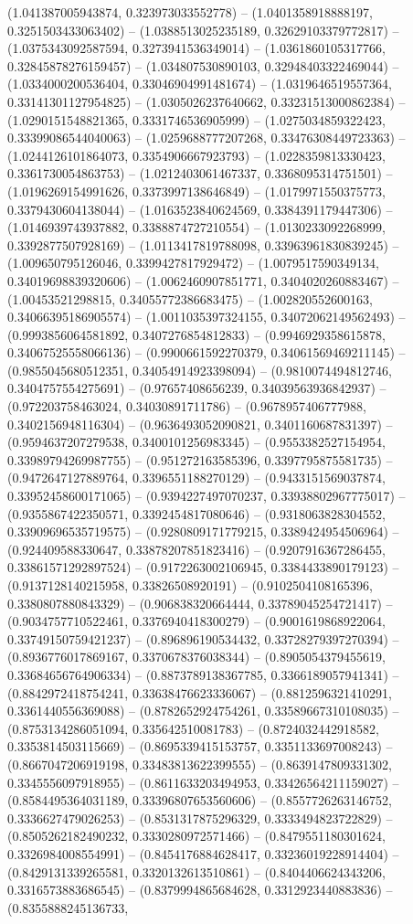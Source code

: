 (1.041387005943874, 0.323973033552778) -- (1.0401358918888197, 0.3251503433063402) -- (1.0388513025235189, 0.32629103379772817) -- (1.0375343092587594, 0.3273941536349014) -- (1.0361860105317766, 0.32845878276159457) -- (1.034807530890103, 0.32948403322469044) -- (1.0334000200536404, 0.33046904991481674) -- (1.0319646519557364, 0.33141301127954825) -- (1.0305026237640662, 0.33231513000862384) -- (1.0290151548821365, 0.3331746536905999) -- (1.0275034859322423, 0.33399086544040063) -- (1.0259688777207268, 0.33476308449723363) -- (1.0244126101864073, 0.3354906667923793) -- (1.0228359813330423, 0.3361730054863753) -- (1.0212403061467337, 0.3368095314751501) -- (1.0196269154991626, 0.3373997138646849) -- (1.0179971550375773, 0.3379430604138044) -- (1.0163523840624569, 0.3384391179447306) -- (1.0146939743937882, 0.3388874727210554) -- (1.0130233092268999, 0.3392877507928169) -- (1.0113417819788098, 0.33963961830839245) -- (1.009650795126046, 0.3399427817929472) -- (1.0079517590349134, 0.34019698839320606) -- (1.0062460907851771, 0.3404020260883467) -- (1.00453521298815, 0.34055772386683475) -- (1.002820552600163, 0.34066395186905574) -- (1.0011035397324155, 0.34072062149562493) -- (0.9993856064581892, 0.3407276854812833) -- (0.9946929358615878, 0.34067525558066136) -- (0.9900661592270379, 0.34061569469211145) -- (0.9855045680512351, 0.34054914923398094) -- (0.9810074494812746, 0.3404757554275691) -- (0.97657408656239, 0.34039563936842937) -- (0.972203758463024, 0.34030891711786) -- (0.9678957406777988, 0.3402156948116304) -- (0.9636493052090821, 0.3401160687831397) -- (0.9594637207279538, 0.3400101256983345) -- (0.9553382527154954, 0.33989794269987755) -- (0.951272163585396, 0.3397795875581735) -- (0.9472647127889764, 0.3396551188270129) -- (0.9433151569037874, 0.33952458600171065) -- (0.9394227497070237, 0.33938802967775017) -- (0.9355867422350571, 0.3392454817080646) -- (0.9318063828304552, 0.33909696535719575) -- (0.9280809171779215, 0.3389424954506964) -- (0.924409588330647, 0.33878207851823416) -- (0.9207916367286455, 0.33861571292897524) -- (0.9172263002106945, 0.3384433890179123) -- (0.9137128140215958, 0.33826508920191) -- (0.9102504108165396, 0.3380807880843329) -- (0.906838320664444, 0.33789045254721417) -- (0.9034757710522461, 0.3376940418300279) -- (0.9001619868922064, 0.33749150759421237) -- (0.896896190534432, 0.33728279397270394) -- (0.8936776017869167, 0.3370678376038344) -- (0.8905054379455619, 0.33684656764906334) -- (0.8873789138367785, 0.3366189057941341) -- (0.8842972418754241, 0.33638476623336067) -- (0.8812596321410291, 0.3361440556369088) -- (0.8782652924754261, 0.33589667310108035) -- (0.8753134286051094, 0.335642510081783) -- (0.8724032442918582, 0.3353814503115669) -- (0.8695339415153757, 0.3351133697008243) -- (0.8667047206919198, 0.33483813622399555) -- (0.8639147809331302, 0.3345556097918955) -- (0.8611633203494953, 0.33426564211159027) -- (0.8584495364031189, 0.33396807653560606) -- (0.8557726263146752, 0.3336627479026253) -- (0.8531317875296329, 0.3333494823722829) -- (0.8505262182490232, 0.3330280972571466) -- (0.8479551180301624, 0.3326984008554991) -- (0.8454176884628417, 0.33236019228914404) -- (0.8429131339265581, 0.3320132613510861) -- (0.8404406624343206, 0.3316573883686545) -- (0.8379994865684628, 0.3312923440883836) -- (0.8355888245136733, 
